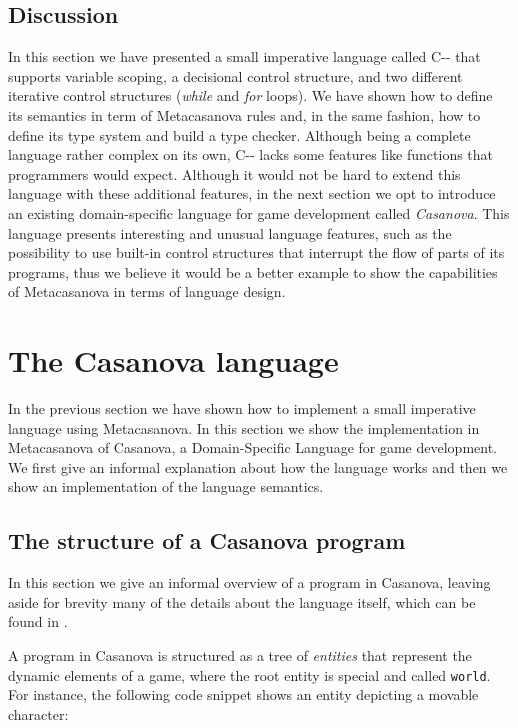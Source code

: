 \subsection{Discussion}
In this section we have presented a small imperative language called C-{}- that supports variable scoping, a decisional control structure, and two different iterative control structures (\textit{while} and \textit{for} loops). We have shown how to define its semantics in term of Metacasanova rules and, in the same fashion, how to define its type system and build a type checker. Although being a complete language rather complex on its own, C-{}- lacks some features like functions that programmers would expect. Although it would not be hard to extend this language with these additional features, in the next section we opt to introduce an existing domain-specific language for game development called \textit{Casanova}. This language presents interesting and unusual language features, such as the possibility to use built-in control structures that interrupt the flow of parts of its programs, thus we believe it would be a better example to show the capabilities of Metacasanova in terms of language design.

\section{The Casanova language}
\label{sec:ch_mcnv_languages_casanova_language}
In the previous section we have shown how to implement a small imperative language using Metacasanova. In this section we show the implementation in Metacasanova of Casanova, a Domain-Specific Language for game development. We first give an informal explanation about how the language works and then we show an implementation of the language semantics.

\subsection{The structure of a Casanova program}
In this section we give an informal overview of a program in Casanova, leaving aside for brevity many of the details about the language itself, which can be found in \cite{ abbadi2014resource, abbadithesis2017, abbadi2015casanova, abbadi2015high}.

A program in Casanova is structured as a tree of \textit{entities} that represent the dynamic elements of a game, where the root entity is special and called \texttt{world}. For instance, the following code snippet shows an entity depicting a movable character:

